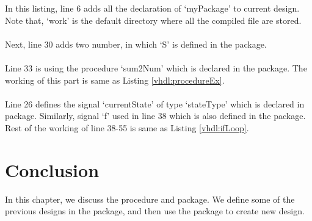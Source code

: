

\begin{explanation}
	In this listing, line 6 adds all the declaration of `myPackage' to current design. Note that, `work' is the default directory where all the compiled file are stored. 
	\\ \\
	Next, line 30 adds two number, in which `S' is defined in the package. 
	\\ \\
	Line 33 is using the procedure `sum2Num' which is declared in the package. The working of this part is same as Listing \ref{vhdl:procedureEx}. 
	\\ \\
	Line 26 defines the signal `currentState' of type `stateType' which is declared in package. Similarly, signal `f' used in line 38 which is also defined in the package. Rest of the working of line 38-55 is same as Listing \ref{vhdl:ifLoop}.
\end{explanation}



\section{Conclusion}
In this chapter, we discuss the procedure and package. We define some of the previous designs in the package, and then use the package to create new design. 